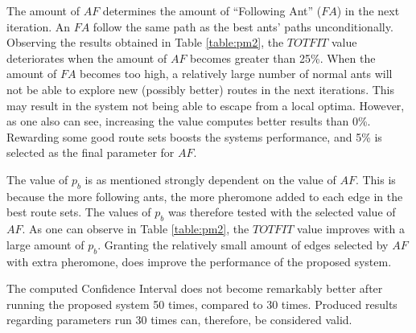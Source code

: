The amount of $AF$ determines the amount of ``Following Ant'' ($FA$) in the next iteration. An $FA$ follow the same path as the best ants' paths unconditionally. Observing the results obtained in Table \vref{table:pm2}, the $TOTFIT$ value deteriorates when the amount of $AF$ becomes greater than 25\%. When the amount of $FA$ becomes too high, a relatively large number of normal ants will not be able to explore new (possibly better) routes in the next iterations. This may result in the system not being able to escape from a local optima. However, as one also can see, increasing the value computes better results than 0\%. Rewarding some good route sets boosts the systems performance, and 5\% is selected as the final parameter for $AF$. 

The value of $p_b$ is as mentioned strongly dependent on the value of $AF$. This is because the more following ants, the more pheromone added to each edge in the best route sets. The values of $p_b$ was therefore tested with the selected value of $AF$. As one can observe in Table \vref{table:pm2}, the $TOTFIT$ value improves with a large amount of $p_b$. Granting the relatively small amount of edges selected by $AF$ with extra pheromone, does improve the performance of the proposed system. 

The computed Confidence Interval does not become remarkably better after running the proposed system 50 times, compared to 30 times. Produced results regarding parameters run 30 times can, therefore, be considered valid.

